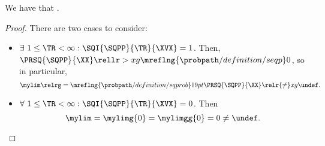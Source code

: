 \begin{proposition}
  We have that \sqpplimdefprop.%
\end{proposition}

\begin{proof}
  There are two cases to consider:
  \begin{itemize}
    \item {} $\exists\ 1 \le \TR < \infty : \SQI{\SQPP}{\TR}{\XVX} = 1$. 
      Then, 
      $\PRSQ{\SQPP}{\XX} \rellr > xg {\mreflng{\probpath/definition/seqp}} 0$, 
      so in particular,
      $$\mylim \relrg = {\mreflng{\probpath/definition/sqprob}} 19pt \PRSQ{\SQPP}{\XX} \relr {\ne} xg \undef.$$
    \item {} $\forall\ 1 \le \TR < \infty : \SQI{\SQPP}{\TR}{\XVX} = 0$. 
      Then
      $$\mylim = \mylimg{0} = \mylimgg{0} = 0 \ne \undef.$$
  \end{itemize}
\end{proof}
